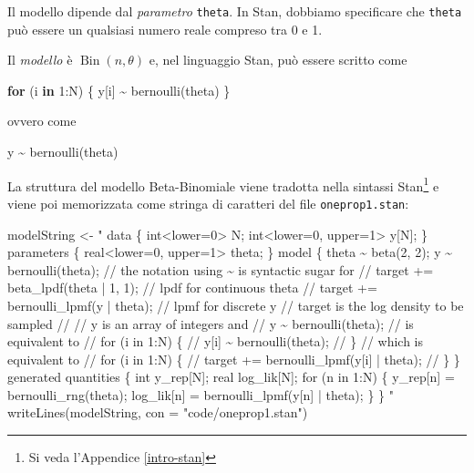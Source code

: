 \documentclass[
]{memoir}
\newenvironment{Shaded}{\begin{snugshade}}{\end{snugshade}}
\newcommand{\AttributeTok}[1]{\textcolor[rgb]{0.77,0.63,0.00}{#1}}
\newcommand{\ControlFlowTok}[1]{\textcolor[rgb]{0.13,0.29,0.53}{\textbf{#1}}}
\newcommand{\DecValTok}[1]{\textcolor[rgb]{0.00,0.00,0.81}{#1}}
\newcommand{\FunctionTok}[1]{\textcolor[rgb]{0.00,0.00,0.00}{#1}}
\newcommand{\NormalTok}[1]{#1}
\newcommand{\OtherTok}[1]{\textcolor[rgb]{0.56,0.35,0.01}{#1}}
\newcommand{\SpecialCharTok}[1]{\textcolor[rgb]{0.00,0.00,0.00}{#1}}
\newcommand{\StringTok}[1]{\textcolor[rgb]{0.31,0.60,0.02}{#1}}
\DeclareMathOperator{\Bin}{Bin} %
\begin{document}
Il modello dipende dal \emph{parametro} \texttt{theta}. In Stan, dobbiamo specificare che \texttt{theta} può essere un qualsiasi numero reale compreso tra 0 e 1.

Il \emph{modello} è \(\Bin(n, \theta)\) e, nel linguaggio Stan, può essere scritto come

\begin{Shaded}
\begin{Highlighting}[]
\ControlFlowTok{for}\NormalTok{ (i }\ControlFlowTok{in} \DecValTok{1}\SpecialCharTok{:}\NormalTok{N) \{}
\NormalTok{  y[i] }\SpecialCharTok{\textasciitilde{}} \FunctionTok{bernoulli}\NormalTok{(theta)}
\NormalTok{\}}
\end{Highlighting}
\end{Shaded}

\noindent
ovvero come

\begin{Shaded}
\begin{Highlighting}[]
\NormalTok{y }\SpecialCharTok{\textasciitilde{}} \FunctionTok{bernoulli}\NormalTok{(theta)}
\end{Highlighting}
\end{Shaded}

La struttura del modello Beta-Binomiale viene tradotta nella sintassi Stan\footnote{Si veda l'Appendice \ref{intro-stan}} e viene poi memorizzata come stringa di caratteri del file \texttt{oneprop1.stan}:

\begin{Shaded}
\begin{Highlighting}[]
\NormalTok{modelString }\OtherTok{\textless{}{-}} \StringTok{"}
\StringTok{data \{}
\StringTok{  int\textless{}lower=0\textgreater{} N;}
\StringTok{  int\textless{}lower=0, upper=1\textgreater{} y[N];}
\StringTok{\}}
\StringTok{parameters \{}
\StringTok{  real\textless{}lower=0, upper=1\textgreater{} theta;}
\StringTok{\}}
\StringTok{model \{}
\StringTok{  theta \textasciitilde{} beta(2, 2);}
\StringTok{  y \textasciitilde{} bernoulli(theta);}
\StringTok{  // the notation using \textasciitilde{} is syntactic sugar for}
\StringTok{  //  target += beta\_lpdf(theta | 1, 1);   // lpdf for continuous theta}
\StringTok{  //  target += bernoulli\_lpmf(y | theta); // lpmf for discrete y}
\StringTok{  // target is the log density to be sampled}
\StringTok{  //}
\StringTok{  // y is an array of integers and}
\StringTok{  //  y \textasciitilde{} bernoulli(theta);}
\StringTok{  // is equivalent to}
\StringTok{  //  for (i in 1:N) \{}
\StringTok{  //    y[i] \textasciitilde{} bernoulli(theta);}
\StringTok{  //  \}}
\StringTok{  // which is equivalent to}
\StringTok{  //  for (i in 1:N) \{}
\StringTok{  //    target += bernoulli\_lpmf(y[i] | theta);}
\StringTok{  //  \}}
\StringTok{\}}
\StringTok{generated quantities \{}
\StringTok{  int y\_rep[N];}
\StringTok{  real log\_lik[N];}
\StringTok{  for (n in 1:N) \{}
\StringTok{    y\_rep[n] = bernoulli\_rng(theta);}
\StringTok{    log\_lik[n] = bernoulli\_lpmf(y[n] | theta);}
\StringTok{  \}}
\StringTok{\}}
\StringTok{"}
\FunctionTok{writeLines}\NormalTok{(modelString, }\AttributeTok{con =} \StringTok{"code/oneprop1.stan"}\NormalTok{)}
\end{Highlighting}
\end{Shaded}
\end{document}

